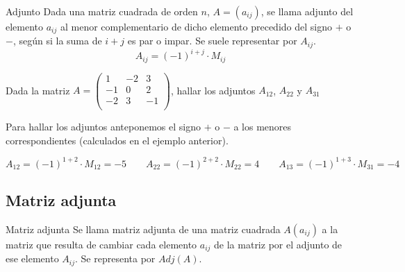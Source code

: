 \begin{definicion}{Adjunto}
Dada una matriz cuadrada de orden $n$, $A=(a_{ij})$, se llama adjunto del elemento $a_{ij}$ al menor complementario de dicho elemento precedido del signo $+$ o $-$, según si la suma de $i+j$ es par o impar. Se suele representar por $A_{ij}$.
\[
A_{ij}=(-1)^{i+j} \cdot M_{ij}
\]
\end{definicion}

\begin{ejemplo}
Dada la matriz $A=\begin{pmatrix} 
 1& -2& 3 \\
 -1& 0& 2 \\
 -2& 3& -1 \\
\end{pmatrix}$, hallar los adjuntos $A_{12}$, $A_{22}$ y $A_{31}$

\tcblower
Para hallar los adjuntos anteponemos el signo $+$ o $-$ a los menores correspondientes (calculados en el ejemplo anterior).

\[
A_{12}=(-1)^{1+2} \cdot M_{12}=-5 \qquad A_{22}=(-1)^{2+2} \cdot M_{22}=4 \qquad A_{13}=(-1)^{1+3} \cdot M_{31}=-4
\]
\end{ejemplo}

\subsection{Matriz adjunta}


\begin{definicion}{Matriz adjunta}
Se llama matriz adjunta de una matriz cuadrada $A(a_{ij})$ a la matriz que resulta de cambiar cada elemento $a_{ij}$ de la matriz por el adjunto de ese elemento $A_{ij}$. Se representa por $Adj(A)$.
\end{definicion}

